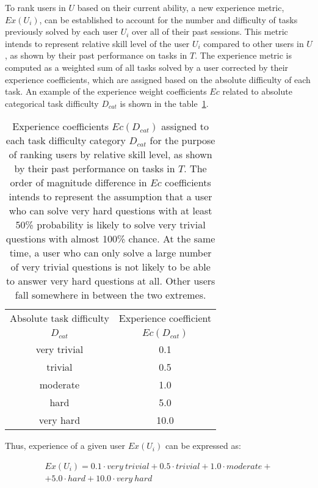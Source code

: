 To rank users in $U$ based on their current ability, a new experience metric, $Ex(U_i)$, can be established to account for the number and difficulty of tasks previously solved by each user $U_i$ over all of their past sessions.
This metric intends to represent relative skill level of the user $U_i$ compared to other users in $U$, as shown by their past performance on tasks in $T$.
The experience metric is computed as a weighted sum of all tasks solved by a user corrected by their experience coefficients, which are assigned based on the absolute difficulty of each task.
An example of the experience weight coefficients $Ec$ related to absolute categorical task difficulty $D_{cat}$ is shown in the table~\ref{tab:experience_coefficients}.

\begin{table}[h!]
    \centering
    \begin{tabular}{ c | c }
        \toprule
        \hline
        Absolute task difficulty & Experience coefficient \\
        $D_{cat}$ & $Ec(D_{cat})$ \\
        \midrule
        \hline
        very trivial & 0.1 \\
        \hline
        trivial & 0.5 \\
        \hline
        moderate & 1.0 \\
        \hline
        hard & 5.0 \\
        \hline
        very hard & 10.0 \\
        \hline
        \bottomrule
    \end{tabular}
    \caption{Experience coefficients $Ec(D_{cat})$ assigned to each task difficulty category $D_{cat}$ for the purpose of ranking users by relative skill level, as shown by their past performance on tasks in $T$.
    The order of magnitude difference in $Ec$ coefficients intends to represent the assumption that a user who can solve very hard questions with at least 50\% probability is likely to solve very trivial questions with almost 100\% chance.
    At the same time, a user who can only solve a large number of very trivial questions is not likely to be able to answer very hard questions at all.
    Other users fall somewhere in between the two extremes.}
    \label{tab:experience_coefficients}
\end{table}

Thus, experience of a given user $Ex(U_i)$ can be expressed as:

\begin{equation} \label{eq:user_ex}
    \begin{split}
        Ex(U_i) = 0.1 \cdot very~trivial +
        0.5 \cdot trivial +
        1.0 \cdot moderate + \\
        + 5.0 \cdot hard +
        10.0 \cdot very~hard
    \end{split}
\end{equation}

